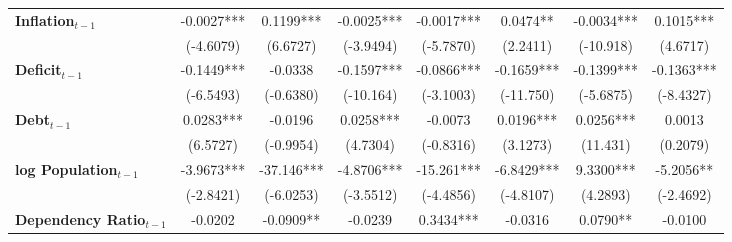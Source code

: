 \begin{center}
\begin{tabular}{lccccccc}
\textbf{Inflation$_{t-1}$}      &      -0.0027***      &          0.1199***          &          -0.0025***          &              -0.0017***             &             0.0474**             &          -0.0034***         &           0.1015***            \\
\textbf{ }                         &      (-4.6079)       &           (6.6727)          &          (-3.9494)           &              (-5.7870)              &             (2.2411)             &          (-10.918)          &            (4.6717)            \\
\textbf{Deficit$_{t-1}$}             &      -0.1449***      &           -0.0338           &          -0.1597***          &              -0.0866***             &            -0.1659***            &          -0.1399***         &           -0.1363***           \\
\textbf{ }                         &      (-6.5493)       &          (-0.6380)          &          (-10.164)           &              (-3.1003)              &            (-11.750)             &          (-5.6875)          &           (-8.4327)            \\
\textbf{Debt$_{t-1}$}                &      0.0283***       &           -0.0196           &          0.0258***           &               -0.0073               &            0.0196***             &          0.0256***          &             0.0013             \\
\textbf{ }                         &       (6.5727)       &          (-0.9954)          &           (4.7304)           &              (-0.8316)              &             (3.1273)             &           (11.431)          &            (0.2079)            \\
\textbf{log Population$_{t-1}$}      &      -3.9673***      &          -37.146***         &          -4.8706***          &              -15.261***             &            -6.8429***            &          9.3300***          &           -5.2056**            \\
\textbf{ }                         &      (-2.8421)       &          (-6.0253)          &          (-3.5512)           &              (-4.4856)              &            (-4.8107)             &           (4.2893)          &           (-2.4692)            \\
\textbf{Dependency Ratio$_{t-1}$}   &       -0.0202        &          -0.0909**          &           -0.0239            &              0.3434***              &             -0.0316              &           0.0790**          &            -0.0100             \\

\end{tabular}
\end{center}
